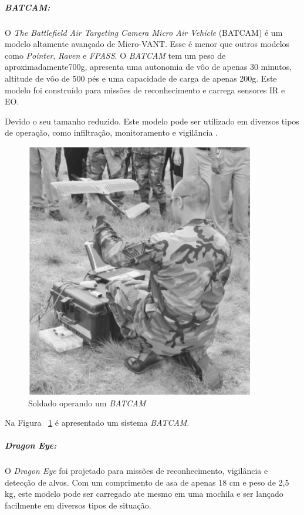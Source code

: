 \subparagraph{ \emph{BATCAM}:}
O \emph{The Battlefield Air Targeting Camera Micro Air
Vehicle} (BATCAM) é um modelo altamente avançado de Micro-VANT. Esse \vant  é menor que outros modelos como \emph{Pointer}, \emph{Raven} e \emph{FPASS}.
O \emph{BATCAM} tem um peso de aproximadamente700g, apresenta uma autonomia de vôo de apenas 30 minutos, altitude de vôo de 500 pés e uma capacidade de carga de
apenas 200g. Este modelo foi construído para missões de reconhecimento e carrega sensores IR e EO.



Devido o seu tamanho reduzido. Este modelo pode ser utilizado em diversos tipos de operação, como infiltração, monitoramento e vigilância \cite{Drew2005}. 

\begin{figure}[h!]
\centering
\includegraphics[width=10cm]{pictures/batcam_system.png}
\caption{ Soldado operando um \emph{BATCAM} }
 \label{fig:holding_batcam}
\end{figure}

Na Figura ~\ref{fig:holding_batcam} é apresentado um sistema \emph{BATCAM}.



\subparagraph{ \emph{Dragon Eye}:}
O \vant \emph{Dragon Eye} foi projetado para missões de reconhecimento, vigilância e detecção de alvos. Com um comprimento de asa de apenas 18 cm e peso de 2,5 kg, este modelo pode ser carregado ate mesmo em uma mochila e ser lançado facilmente em diversos tipos de situação.

